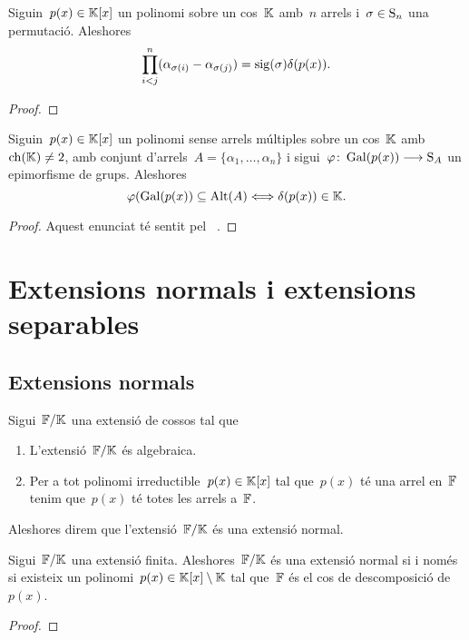 \documentclass[../Apunts.tex]{subfiles}
\begin{document}
	\begin{lemma}
		\label{lema:discriminant}
		Siguin~\(p(x)\in\mathbb{K}[x]\) un polinomi sobre un cos~\(\mathbb{K}\) amb~\(n\) arrels i~\(\sigma\in\operatorname{S}_{n}\) una permutació. Aleshores
		\[\prod_{i<j}^{n}(\alpha_{\sigma(i)}-\alpha_{\sigma(j)})=\operatorname{sig}(\sigma)\delta(p(x)).\]
	\end{lemma}
	\begin{proof}
	\end{proof}
	\begin{corollary}
		\label{cor:l'arrel del discriminant d'un polinomi pertany al cos si i només si el grup de Galois del polinomi és un subgrup dels alternats de les arrels}
		Siguin~\(p(x)\in\mathbb{K}[x]\) un polinomi sense arrels múltiples sobre un cos~\(\mathbb{K}\) amb~\(\operatorname{ch}(\mathbb{K})\neq2\), amb conjunt d'arrels~\(A=\{\alpha_{1},\dots,\alpha_{n}\}\) i sigui~\(\varphi\colon\operatorname{Gal}(p(x))\longrightarrow\operatorname{S}_{A}\) un epimorfisme de grups.
		Aleshores
		\[\varphi(\operatorname{Gal}(p(x))\subseteq\operatorname{Alt}(A)\Longleftrightarrow\delta(p(x))\in\mathbb{K}.\]
	\end{corollary}
	\begin{proof}
		Aquest enunciat té sentit pel \corollari~.
	\end{proof}
\section{Extensions normals i extensions separables}
	\subsection{Extensions normals}
	\begin{definition}
		\label{def:extensió normal}
		Sigui~\(\mathbb{F}/\mathbb{K}\) una extensió de cossos tal que
		\begin{enumerate}
			\item L'extensió~\(\mathbb{F}/\mathbb{K}\) és algebraica.
			\item Per a tot polinomi irreductible~\(p(x)\in\mathbb{K}[x]\) tal que~\(p(x)\) té una arrel en~\(\mathbb{F}\) tenim que~\(p(x)\) té totes les arrels a~\(\mathbb{F}\).
		\end{enumerate}
		Aleshores direm que l'extensió~\(\mathbb{F}/\mathbb{K}\) és una extensió normal.
	\end{definition}
	\begin{theorem}
		\label{thm:Teorema de normalitat}
		Sigui~\(\mathbb{F}/\mathbb{K}\) una extensió finita. Aleshores~\(\mathbb{F}/\mathbb{K}\) és una extensió normal si i només si existeix un polinomi~\(p(x)\in\mathbb{K}[x]\setminus\mathbb{K}\) tal que~\(\mathbb{F}\) és el cos de descomposició de~\(p(x)\).
	\end{theorem}
	\begin{proof}
	\end{proof}
\end{document}

